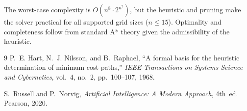 \documentclass[12pt,a4paper]{article}
\begin{document}
The worst-case complexity is $O(n^8 \cdot 2^{n^2})$, but the heuristic and
pruning make the solver practical for all supported grid sizes ($n \le 15$).
Optimality and completeness follow from standard A* theory given the
admissibility of the heuristic.

\begin{thebibliography}{9}
  P.~E. Hart, N.~J. Nilsson, and B.~Raphael,
  ``A formal basis for the heuristic determination of minimum cost paths,''
  \textit{IEEE Transactions on Systems Science and Cybernetics},
  vol.~4, no.~2, pp.~100--107, 1968.

  S.~Russell and P.~Norvig,
  \textit{Artificial Intelligence: A Modern Approach}, 4th~ed.
  Pearson, 2020.
\end{thebibliography}
\end{document}

